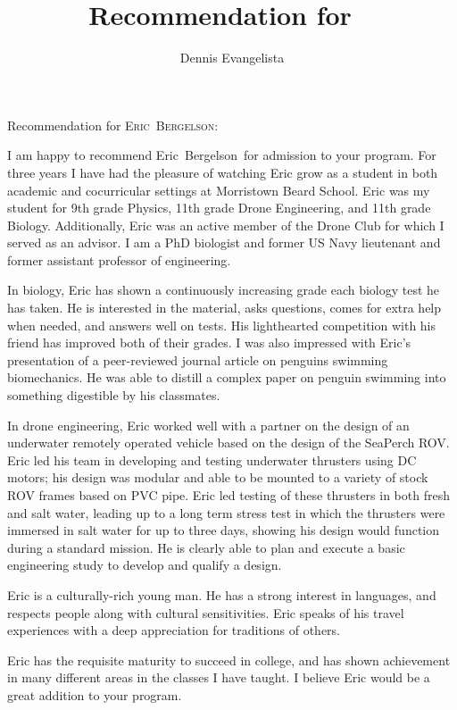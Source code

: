 \documentclass[12pt]{letter}
\title{Recommendation for \firstname\ \lastname}
\author{Dennis Evangelista}
\date{}
\newcommand\firstname{Eric}
\newcommand\lastname{Bergelson}
\begin{document}
\begin{letter}{%
}

\opening{Recommendation for {\scshape\firstname\ \lastname}:}

I am happy to recommend \firstname\ \lastname\ for admission to your program.  For three years I have had the pleasure of watching Eric grow as a student in both academic and cocurricular settings at Morristown Beard School. Eric was my student for 9th grade Physics, 11th grade Drone Engineering, and 11th grade Biology. Additionally, Eric was an active member of the Drone Club for which I served as an advisor.  I am a PhD biologist and former US Navy lieutenant and former assistant professor of engineering. 

In biology, Eric has shown a continuously increasing grade each biology test he has taken.  He is interested in the material, asks questions, comes for extra help when needed, and answers well on tests. His lighthearted competition with his friend has improved both of their grades. I was also impressed with Eric's presentation of a peer-reviewed journal article on penguins swimming biomechanics. He was able to distill a complex paper on penguin swimming into something digestible by his classmates.

In drone engineering, Eric worked well with a partner on the design of an underwater remotely operated vehicle based on the design of the SeaPerch ROV.  Eric led his team in developing and testing underwater thrusters using DC motors; his design was modular and able to be mounted to a variety of stock ROV frames based on PVC pipe. Eric led testing of these thrusters in both fresh and salt water, leading up to a long term stress test in which the thrusters were immersed in salt water for up to three days, showing his design would function during a standard mission. He is clearly able to plan and execute a basic engineering study to develop and qualify a design.

Eric is a culturally-rich young man. He has a strong interest in languages, and respects people along with cultural sensitivities. Eric speaks of his travel experiences with a deep appreciation for traditions of others.

Eric has the requisite maturity to succeed in college, and has shown achievement in many different areas in the classes I have taught. I believe Eric would be a great addition to your program. 

\noclosing

\end{letter}
\end{document}
